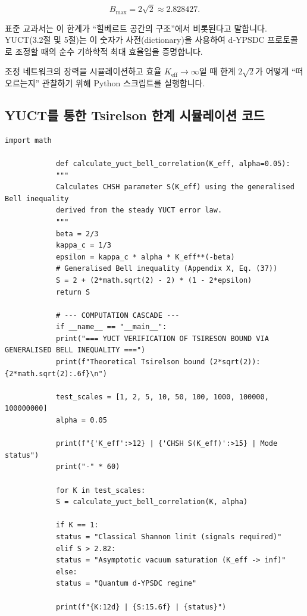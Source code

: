\documentclass[12pt,a4paper]{article}
\begin{document}
	\[
	B_{\mathrm{max}} = 2\sqrt{2} \approx 2.828427.
	\]
	
	표준 교과서는 이 한계가 “힐베르트 공간의 구조”에서 비롯된다고 말합니다. YUCT(3.2절 및 5절)는 이 숫자가 사전(dictionary)을 사용하여 d‑YPSDC 프로토콜로 조정할 때의 순수 기하학적 최대 효율임을 증명합니다.
	
	조정 네트워크의 장력을 시뮬레이션하고 효율 \(K_{\mathrm{eff}} \to \infty\)일 때 한계 \(2\sqrt{2}\)가 어떻게 “떠오르는지” 관찰하기 위해 Python 스크립트를 실행합니다.
	
	\subsection{YUCT를 통한 Tsirelson 한계 시뮬레이션 코드}
	
	\begin{tcolorbox}[
		colback=gray!5, 
		colframe=black!75, 
		title=YUCT Python 코드: 일반화된 벨 부등식을 통한 Tsirelson 한계 계산,
		fonttitle=\small\ttfamily,
		arc=2mm,
		fontupper=\scriptsize,
		left=1mm, right=1mm,
		top=1mm, bottom=1mm
		]
		\begin{lstlisting}[basicstyle=\scriptsize\ttfamily, breaklines=true, columns=fullflexible]
			import math
			
			def calculate_yuct_bell_correlation(K_eff, alpha=0.05):
			"""
			Calculates CHSH parameter S(K_eff) using the generalised Bell inequality
			derived from the steady YUCT error law.
			"""
			beta = 2/3
			kappa_c = 1/3
			epsilon = kappa_c * alpha * K_eff**(-beta)
			# Generalised Bell inequality (Appendix X, Eq. (37))
			S = 2 + (2*math.sqrt(2) - 2) * (1 - 2*epsilon)
			return S
			
			# --- COMPUTATION CASCADE ---
			if __name__ == "__main__":
			print("=== YUCT VERIFICATION OF TSIRESON BOUND VIA GENERALISED BELL INEQUALITY ===")
			print(f"Theoretical Tsirelson bound (2*sqrt(2)): {2*math.sqrt(2):.6f}\n")
			
			test_scales = [1, 2, 5, 10, 50, 100, 1000, 100000, 100000000]
			alpha = 0.05
			
			print(f"{'K_eff':>12} | {'CHSH S(K_eff)':>15} | Mode status")
			print("-" * 60)
			
			for K in test_scales:
			S = calculate_yuct_bell_correlation(K, alpha)
			
			if K == 1:
			status = "Classical Shannon limit (signals required)"
			elif S > 2.82:
			status = "Asymptotic vacuum saturation (K_eff -> inf)"
			else:
			status = "Quantum d-YPSDC regime"
			
			print(f"{K:12d} | {S:15.6f} | {status}")
		\end{lstlisting}
	\end{tcolorbox}
	
\end{document}
